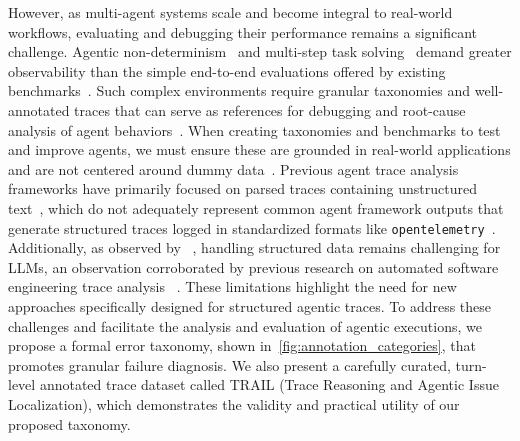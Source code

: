 However, as multi-agent systems scale and become integral to real-world workflows, evaluating and debugging their performance remains a significant challenge. Agentic non-determinism~\cite{laban2025llms,patronus2025statistical_risk} and multi-step task solving~\cite{mialon2023gaia,yao2024tau} demand greater observability than the simple end-to-end evaluations offered by existing benchmarks~\cite{kapoor2024ai, zhuge2024agent, moshkovich2025beyond, cemri2025multi}. Such complex environments require granular taxonomies and well-annotated traces that can serve as references for debugging and root-cause analysis of agent behaviors~\cite{cemri2025multi}.
When creating taxonomies and benchmarks to test and improve agents, we must ensure these are grounded in real-world applications and are not centered around dummy data~\cite{bowman2021will, liu2024ecbd}. Previous agent trace analysis frameworks have primarily focused on parsed traces containing unstructured text~\cite{cemri2025multi}, which do not adequately represent common agent framework outputs that generate structured traces logged in standardized formats like \texttt{opentelemetry}~\cite{opentelemetry}. Additionally, as observed by ~\citet{guo2023gpt4graph, sui2024tablellm}, handling structured data remains challenging for LLMs, an observation corroborated by previous research on automated software engineering trace analysis ~\cite{roy2024exploring, ma2024llmparser}. These limitations highlight the need for new approaches specifically designed for structured agentic traces.
To address these challenges and facilitate the analysis and evaluation of agentic executions, we propose a formal error taxonomy, shown in~\autoref{fig:annotation_categories}, that promotes granular failure diagnosis. We also present a carefully curated, turn-level annotated trace dataset called \textsc{TRAIL} (Trace Reasoning and Agentic Issue Localization), which demonstrates the validity and practical utility of our proposed taxonomy.


